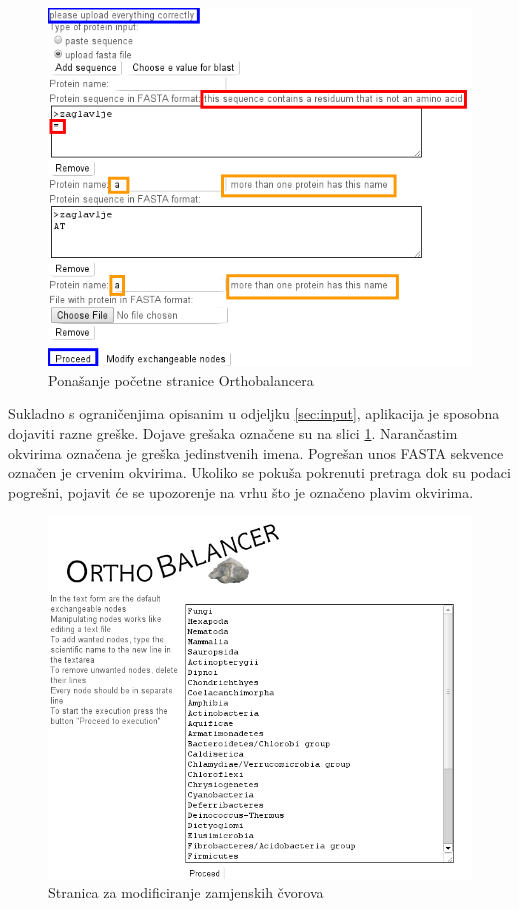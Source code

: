 \begin{figure}[h!]
\centering
\includegraphics[width=4.8in]{figures/input-error.png}
\caption{Ponašanje početne stranice Orthobalancera}
\label{fig:input-error}
\end{figure} 
 
Sukladno s ograničenjima opisanim u odjeljku \ref{sec:input}, aplikacija je
sposobna dojaviti razne greške. Dojave grešaka označene su na slici
\ref{fig:input-error}. Narančastim okvirima označena je greška jedinstvenih
imena. Pogrešan unos FASTA sekvence označen je crvenim okvirima. Ukoliko se
pokuša pokrenuti pretraga dok su podaci pogrešni, pojavit će se upozorenje na
vrhu što je označeno plavim okvirima.

\begin{figure}[h!]
\centering
\includegraphics[width=5.0in]{figures/exchangeable-html.png}
\caption{Stranica za modificiranje zamjenskih čvorova}
\label{fig:exchangeable-html}
\end{figure} 
 

